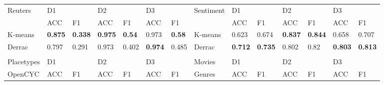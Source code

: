 {\begin{landscape}
	\begin{table}[]
		\footnotesize
		\begin{tabular}{llllllllllllll}
		Reuters     & D1                              &                                 & D2                              &                                 & D3                              &                                 & Sentiment                      & D1                              &                                 & D2                              &                                 & D3                              &                                             \\
& ACC                             & F1                              & ACC                             & F1                              & ACC                             & F1                              &                                & ACC                             & F1                              & ACC                             & F1                              & ACC                             & F1                                    \\
\toprule
K-means     & \textbf{0.875} & \textbf{0.338} & \textbf{0.975} & \textbf{0.54}  & 0.973                           & \textbf{0.58}  & K-means                        & 0.623                           & 0.674                           & \textbf{0.837} & \textbf{0.844} & 0.658                           & 0.707                                   \\
\midrule
Derrac      & 0.797                           & 0.291                           & 0.973                           & 0.402                           & \textbf{0.974} & 0.485                           & Derrac                         & \textbf{0.712} & \textbf{0.735} & 0.802                           & 0.82                            & \textbf{0.803} & \textbf{0.813}            \\
&&&&&&\\
Placetypes  & D1                              &                                 & D2                              &                                 & D3                              &                                 & Movies                         & D1                              &                                 & D2                              &                                 & D3                              &                          \\
OpenCYC     & ACC                             & F1                              & ACC                             & F1                              & ACC                             & F1                              & Genres                         & ACC                             & F1                              & ACC                             & F1                              & ACC                             & F1                                         \\

\end{tabular}
\end{table}
\end{landscape}}
